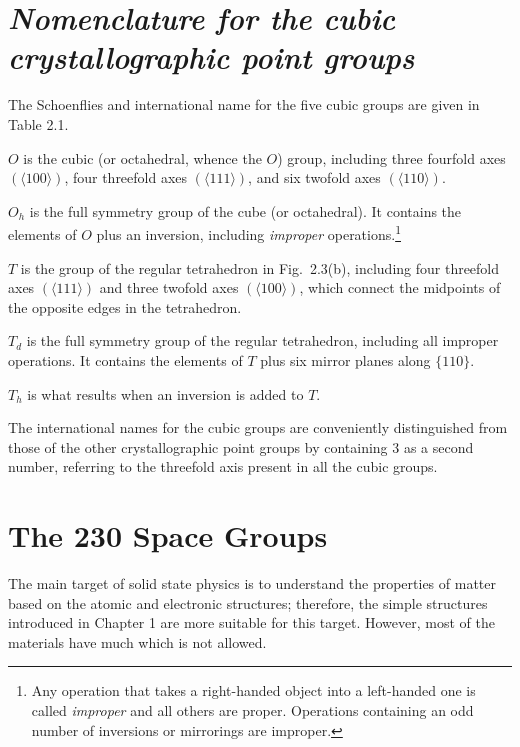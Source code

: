 \section*{\em Nomenclature for the cubic crystallographic point groups}

The Schoenflies and international name for the five cubic groups are given in Table 2.1.

$O$ is the cubic (or octahedral, whence the $O$) group, including three fourfold axes $(\langle 100\rangle)$, four threefold axes $(\langle 111\rangle)$, and six twofold axes $(\langle 110 \rangle)$.

$O_{h}$ is the full symmetry group of the cube (or octahedral). It contains the elements of $O$ plus an inversion, including {\em improper} operations.\footnote{Any operation that takes a right-handed object into a left-handed one is called {\em improper} and all others are proper. Operations containing an odd number of inversions or mirrorings are improper.}

$T$ is the group of the regular tetrahedron in Fig.~2.3(b), including four threefold axes $(\langle 111\rangle)$ and three twofold axes $(\langle 100\rangle)$, which connect the midpoints of the opposite edges in the tetrahedron.

$T_{d}$ is the full symmetry group of the regular tetrahedron, including all improper operations. It contains the elements of $T$ plus six mirror planes along $\{110\}$.

$T_{h}$ is what results when an inversion is added to $T$.

The international names for the cubic groups are conveniently distinguished from those of the other crystallographic point groups by containing 3 as a second number, referring to the threefold axis present in all the cubic groups.

\section*{The 230 Space Groups}

The main target of solid state physics is to understand the properties of matter based on the atomic and electronic structures; therefore, the simple structures introduced in Chapter 1 are more suitable for this target. However, most of the materials have much which is not allowed. 

